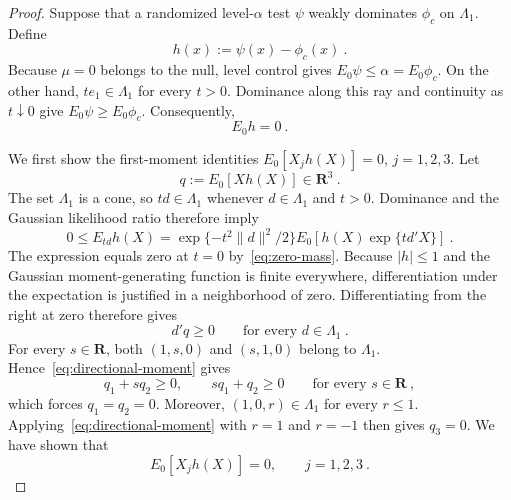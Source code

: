 \documentclass[12pt]{article}
\theoremstyle{remark}
\begin{document}
\begin{proof}
Suppose that a randomized level-$\alpha$ test $\psi$ weakly dominates
$\phi_c$ on $\Lambda_1$.  Define
\[
h(x):=\psi(x)-\phi_c(x)~.
\]
Because $\mu=0$ belongs to the null, level control gives
$E_0\psi\le\alpha=E_0\phi_c$.  On the other hand, $t e_1\in\Lambda_1$ for
every $t>0$.  Dominance along this ray and continuity as $t\downarrow0$ give
$E_0\psi\ge E_0\phi_c$.  Consequently,
\begin{equation}\label{eq:zero-mass}
E_0h=0~.
\end{equation}

We first show the first-moment identities $E_0[X_jh(X)]=0$, $j=1,2,3$.  Let
\[
q:=E_0[Xh(X)]\in\mathbf R^3~.
\]
The set $\Lambda_1$ is a cone, so $td\in\Lambda_1$ whenever
$d\in\Lambda_1$ and $t>0$.  Dominance and the Gaussian likelihood ratio
therefore imply
\[
0\le E_{td}h(X)
=
\exp\{-t^2\|d\|^2/2\}
E_0\!\left[h(X)\exp\{t d'X\}\right]~.
\]
The expression equals zero at $t=0$ by~\eqref{eq:zero-mass}.
Because $|h|\le1$ and the Gaussian moment-generating function is finite
everywhere, differentiation under the expectation is justified in a
neighborhood of zero.  Differentiating from the right at zero therefore gives
\begin{equation}\label{eq:directional-moment}
d'q\ge0
\qquad\text{for every }d\in\Lambda_1~.
\end{equation}
For every $s\in\mathbf R$, both $(1,s,0)$ and $(s,1,0)$ belong to
$\Lambda_1$.  Hence~\eqref{eq:directional-moment} gives
\[
q_1+s q_2\ge0,
\qquad
s q_1+q_2\ge0
\qquad\text{for every }s\in\mathbf R~,
\]
which forces $q_1=q_2=0$.  Moreover, $(1,0,r)\in\Lambda_1$ for every
$r\le1$.  Applying~\eqref{eq:directional-moment} with $r=1$ and $r=-1$
then gives $q_3=0$.  We have shown that
\begin{equation}\label{eq:zero-first-moments}
E_0[X_jh(X)]=0,
\qquad j=1,2,3~.
\end{equation}


\end{proof}
\end{document}
